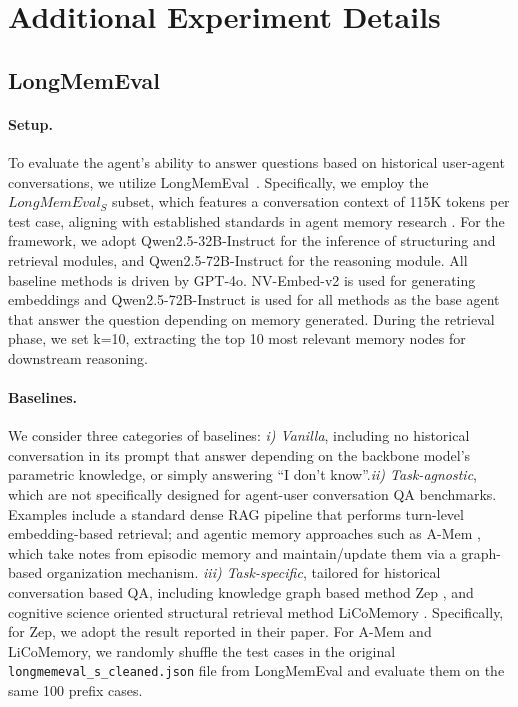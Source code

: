 \section{Additional Experiment Details}
\label{app:add_exp_details}
\subsection{LongMemEval}
\paragraph{Setup.}

To evaluate the agent's ability to answer questions based on historical user-agent conversations, we utilize LongMemEval~\cite{wu2024longmemeval}. Specifically, we employ the $LongMemEval_{S}$ subset, which features a conversation context of 115K tokens per test case, aligning with established standards in agent memory research \cite{li2025memosmemoryosai,rasmussen2025zeptemporalknowledgegraph}. For the \plugmem framework, we adopt Qwen2.5-32B-Instruct for the inference of structuring and retrieval modules, and Qwen2.5-72B-Instruct for the reasoning module. All baseline methods is driven by GPT-4o. NV-Embed-v2 is used for generating embeddings and Qwen2.5-72B-Instruct is used for all methods as the base agent that answer the question depending on memory generated. During the retrieval phase, we set k=10, extracting the top 10 most relevant memory nodes for downstream reasoning.

\paragraph{Baselines.}


We consider three categories of baselines: \textit{i) Vanilla}, including no historical conversation in its prompt that answer depending on the backbone model’s parametric knowledge, or simply answering “I don’t know”.\textit{ii) Task-agnostic}, which are not specifically designed for agent-user conversation QA benchmarks. Examples include a standard dense RAG pipeline that performs turn-level embedding-based retrieval; and agentic memory approaches such as A-Mem \citep{xu2025amemagenticmemoryllm}, which take notes from episodic memory and maintain/update them via a graph-based organization mechanism. \textit{iii) Task-specific}, tailored for historical conversation based QA, including knowledge graph based method  Zep \cite{rasmussen2025zeptemporalknowledgegraph}, and cognitive science oriented structural retrieval method LiCoMemory \cite{huang2026licomemorylightweightcognitiveagentic}. Specifically, for Zep, we adopt the result reported in their paper. For A-Mem and LiCoMemory, we randomly shuffle the test cases in the original \texttt{longmemeval\_s\_cleaned.json} file from LongMemEval and evaluate them on the same 100 prefix cases.


